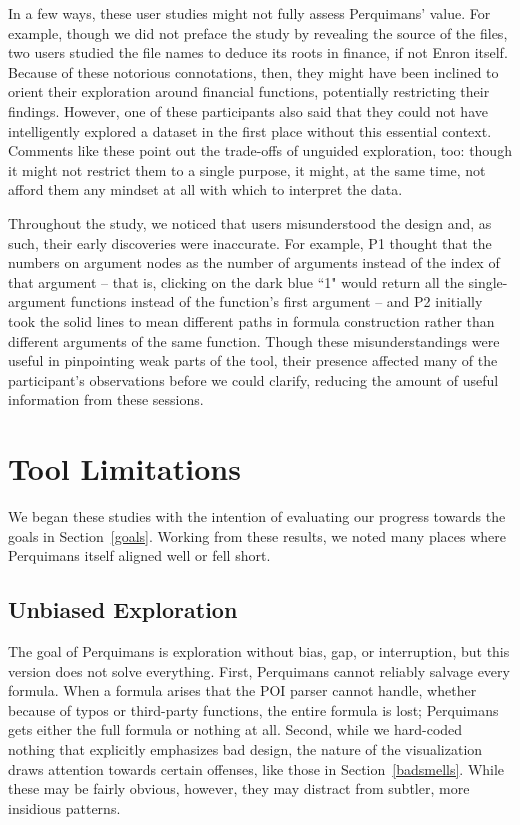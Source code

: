 \documentclass[conference]{IEEEtran}
\newcommand{\toolname}{Perquimans\xspace} \newcommand{\toolnameend}{Perquimans}
\newcommand{\toolnameposs}{Perquimans' }
\begin{document}
	In a few ways, these user studies might not fully assess \toolnameposs value.
	For example, though we did not preface the study by revealing the source of the
	files, two users studied the file names to deduce its roots in finance, if not
	Enron itself. Because of these notorious connotations, then, they might have
	been inclined to orient their exploration around financial functions,
	potentially restricting their findings. However, one of these participants also
	said that they could not have intelligently explored a dataset in the first
	place without this essential context. Comments like these point out the
	trade-offs of unguided exploration, too: though it might not restrict them to a
	single purpose, it might, at the same time, not afford them any mindset at all
	with which to interpret the data. \par
	
	Throughout the study, we noticed that users misunderstood the design
	and, as such, their early discoveries were inaccurate. For example, P1
	thought that the numbers on argument nodes as the number of arguments instead
	of the index of that argument -- that is, clicking on the dark blue
	``1" would return all the single-argument functions instead of the function's
	first argument -- and P2 initially took the solid lines to mean
	different paths in formula construction rather than different arguments of the
	same function. Though these misunderstandings were useful in pinpointing weak
	parts of the tool, their presence affected many of the participant's observations before we
	could clarify, reducing the amount of useful information from these sessions.  \par
	
	
	\section{Tool Limitations} 
	
	We began these studies with the intention of evaluating
	our progress towards the goals in Section~\ref{goals}. Working from these
	results, we noted many places where \toolname itself aligned well or fell short.
	
	\subsection{Unbiased Exploration} 
	
	The goal of \toolname is exploration without bias, gap, or interruption, but 
	this version does not solve everything. First, \toolname cannot reliably
	salvage every formula. When a formula arises that the POI parser cannot handle,
	whether because of typos or third-party functions, the entire formula is lost;
	\toolname gets either the full formula or nothing at all. Second, while we 
	hard-coded nothing that explicitly emphasizes bad design, the nature of the
	visualization draws attention towards certain offenses, like those in
	Section~\ref{badsmells}. While these may be fairly obvious, however, they 
	may distract from subtler, more insidious patterns. \par 
	
\end{document}
